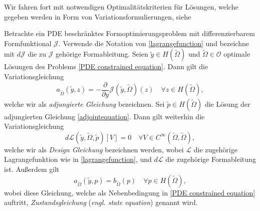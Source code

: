 Wir fahren fort mit notwendigen Optimalitätskriterien für Lösungen, welche gegeben werden in Form von Variationsformulierungen, siehe \cite{LagrangeNewton}

\begin{defi}
	Betrachte ein PDE beschränktes Formoptimierungsproblem mit differenzierbarem Formfunktional $\mathcal{J}$. Verwende die Notation von \ref{lagrangefunction} und bezeichne mit $d\mathcal{J}$ die zu $\mathcal{J}$ gehörige Formableitung. Seien $\tilde{y} \in H(\tilde{\Omega})$ und $\tilde{\Omega}\in \mathcal{O}$ optimale Lösungen des Problems \ref{PDE constrained equation}. Dann gilt die Variationsgleichung
\begin{equation}\label{adjointequation}
	a_{\tilde{\Omega}}(\tilde{y},z) = - \frac{\partial}{\partial y} \mathcal{J}(\tilde{y},\tilde{\Omega})(z) \quad \forall z\in H(\tilde{\Omega}),
\end{equation}
welche wir als \textit{adjungierte Gleichung} bezeichnen. Sei $\tilde{p} \in H(\tilde{\Omega})$ die Lösung der adjungierten Gleichung \ref{adjointequation}. Dann gilt weiterhin die Variationsgleichung
\begin{equation}\label{Design equation}
	d\mathcal{L}(\tilde{y}, \tilde{\Omega}, \tilde{p})[V] = 0 \quad \forall V \in C^\infty(\tilde{\Omega},\tilde{\Omega}),
\end{equation}
welche wir als \textit{Design Gleichung} bezeichnen werden, wobei $\mathcal{L}$ die zugehörige Lagrangefunktion wie in \ref{lagrangefunction}, und $d\mathcal{L}$ die zugehörige Formableitung ist. Außerdem gilt
\begin{equation}
	a_{\tilde{\Omega}}(\tilde{y},p) = b_{\tilde{\Omega}}(p) \quad \forall p \in H(\tilde{\Omega}),
\end{equation}
wobei diese Gleichung, welche als Nebenbedingung in \ref{PDE constrained equation} auftritt, \textit{Zustandsgleichung} (\textit{engl. state equation}) genannt wird.
\end{defi}

